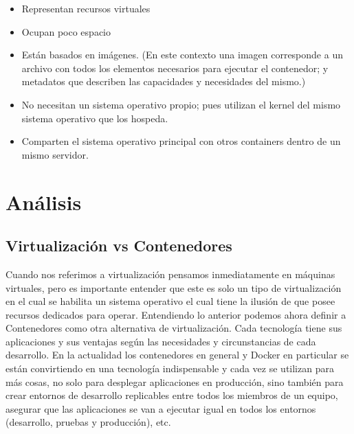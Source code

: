 \documentclass[preprint,12pt]{elsarticle}
\begin{document}
\begin{itemize}

\item Representan recursos virtuales
\item  Ocupan poco espacio
\item  Están basados en imágenes. (En este contexto una imagen corresponde a un archivo con todos los elementos necesarios para ejecutar el contenedor; y metadatos que describen las capacidades y necesidades del mismo.)
\item  No necesitan un sistema operativo propio; pues utilizan el kernel del mismo sistema operativo que los hospeda.
\item  Comparten el sistema operativo principal con otros containers dentro de un mismo servidor. 

\end{itemize}






\section{Análisis}
\subsection{\textbf{Virtualización vs Contenedores}}
Cuando nos referimos a virtualización pensamos inmediatamente en máquinas virtuales, pero es importante entender que este es solo un tipo de virtualización en el cual se habilita un sistema operativo el cual tiene la ilusión de que posee recursos dedicados para operar. Entendiendo lo anterior podemos ahora definir a Contenedores como otra alternativa de virtualización.
Cada tecnología tiene sus aplicaciones y sus ventajas según las necesidades y circunstancias de cada desarrollo. En la actualidad los contenedores en general y Docker en particular se están convirtiendo en una tecnología indispensable y cada vez se utilizan para más cosas, no solo para desplegar aplicaciones en producción, sino también para crear entornos de desarrollo replicables entre todos los miembros de un equipo, asegurar que las aplicaciones se van a ejecutar igual en todos los entornos (desarrollo, pruebas y producción), etc. 
\end{document}
